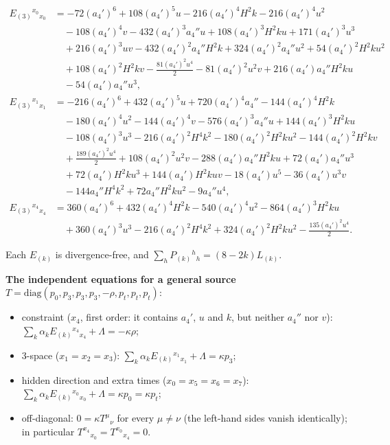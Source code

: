 \documentclass[11pt]{article}
\begin{document}
\[
\begin{aligned}
E_{(3)}{}^{x_0}{}_{x_0} &= -72 (a_4')^6+108 (a_4')^5 u-216 (a_4')^4 H^2 k-216 (a_4')^4 u^2 \\
&\quad -108 (a_4')^4 v-432 (a_4')^3 a_4'' u+108 (a_4')^3 H^2 k u+171 (a_4')^3 u^3 \\
&\quad +216 (a_4')^3 u v-432 (a_4')^2 a_4'' H^2 k+324 (a_4')^2 a_4'' u^2+54 (a_4')^2 H^2 k u^2 \\
&\quad +108 (a_4')^2 H^2 k v-\frac{81 (a_4')^2 u^4}{2}-81 (a_4')^2 u^2 v+216 (a_4') a_4'' H^2 k u \\
&\quad -54 (a_4') a_4'' u^3, \\
E_{(3)}{}^{x_1}{}_{x_1} &= -216 (a_4')^6+432 (a_4')^5 u+720 (a_4')^4 a_4''-144 (a_4')^4 H^2 k \\
&\quad -180 (a_4')^4 u^2-144 (a_4')^4 v-576 (a_4')^3 a_4'' u+144 (a_4')^3 H^2 k u \\
&\quad -108 (a_4')^3 u^3-216 (a_4')^2 H^4 k^2-180 (a_4')^2 H^2 k u^2-144 (a_4')^2 H^2 k v \\
&\quad +\frac{189 (a_4')^2 u^4}{2}+108 (a_4')^2 u^2 v-288 (a_4') a_4'' H^2 k u+72 (a_4') a_4'' u^3 \\
&\quad +72 (a_4') H^2 k u^3+144 (a_4') H^2 k u v-18 (a_4') u^5-36 (a_4') u^3 v \\
&\quad -144 a_4'' H^4 k^2+72 a_4'' H^2 k u^2-9 a_4'' u^4, \\
E_{(3)}{}^{x_4}{}_{x_4} &= 360 (a_4')^6+432 (a_4')^4 H^2 k-540 (a_4')^4 u^2-864 (a_4')^3 H^2 k u \\
&\quad +360 (a_4')^3 u^3-216 (a_4')^2 H^4 k^2+324 (a_4')^2 H^2 k u^2-\frac{135 (a_4')^2 u^4}{2}.
\end{aligned}
\]

Each $E_{(k)}$ is divergence-free, and $\sum_h P_{(k)}{}^h{}_h = (8 - 2k)L_{(k)}$.

\textbf{The independent equations for a general source} $T = \mathrm{diag}(p_0, p_3, p_3, p_3, -\rho, p_t, p_t, p_t)$:

\begin{itemize}
\item constraint ($x_4$, first order: it contains $a_4'$, $u$ and $k$, but neither $a_4''$ nor $v$): $\sum_k\alpha_k E_{(k)}{}^{x_4}{}_{x_4} + \Lambda = -\kappa\rho$;
\item 3-space ($x_1 = x_2 = x_3$): $\sum_k\alpha_k E_{(k)}{}^{x_1}{}_{x_1} + \Lambda = \kappa p_3$;
\item hidden direction and extra times ($x_0 = x_5 = x_6 = x_7$): $\sum_k\alpha_k E_{(k)}{}^{x_0}{}_{x_0} + \Lambda = \kappa p_0 = \kappa p_t$;
\item off-diagonal: $0 = \kappa T^\mu{}_\nu$ for every $\mu \ne \nu$ (the left-hand sides vanish identically); in particular $T^{x_4}{}_{x_0} = T^{x_0}{}_{x_4} = 0$.
\end{itemize}
\end{document}
